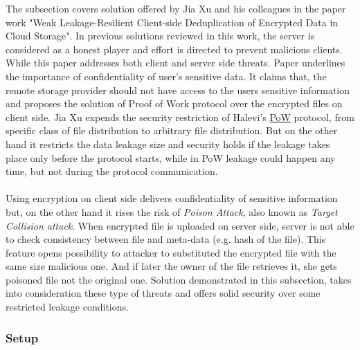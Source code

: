 \documentclass[12pt]{article}
\begin{document}
The subsection covers solution offered by Jia Xu and his colleagues in the paper work "Weak Leakage-Resilient Client-side Deduplication of Encrypted Data in Cloud Storage".\cite{Leakage-Resilient} In previous solutions reviewed in this work, the server is considered as a honest player and effort is directed to prevent malicious clients. While this paper addresses both client and server side threats. Paper underlines the importance of confidentiality of user's sensitive data. It claims that, the remote storage provider should not have access to the users sensitive information and proposes the solution of Proof of Work protocol over the encrypted files on client side. Jia Xu expends the security restriction of Halevi's \hyperref[sub:Soltuion1]{PoW}  protocol, from specific class of file distribution to arbitrary file distribution. But on the other hand it restricts the data leakage size and security holds if the leakage takes place only before the protocol starts, while in PoW leakage could happen any time, but not during the protocol communication.\\\\
Using encryption on client side delivers confidentiality of sensitive information but, on the other hand it rises the risk of \textit{Poison Attack}, also known as \textit{Target Collision attack}.\cite{PoisonAttac} When encrypted file is uploaded on server side, server is not able to check consistency between file and meta-data (e.g. hash of the file). This feature opens possibility to attacker to substituted the encrypted file with the same size malicious one. And if later the owner of the file retrieves it, she gets poisoned file not the original one. Solution demonstrated in this subsection, takes into consideration these type of threats and  offers solid security over some restricted leakage conditions.


\subsubsection{Setup}
\label{subsub:setup4}
\end{document}
